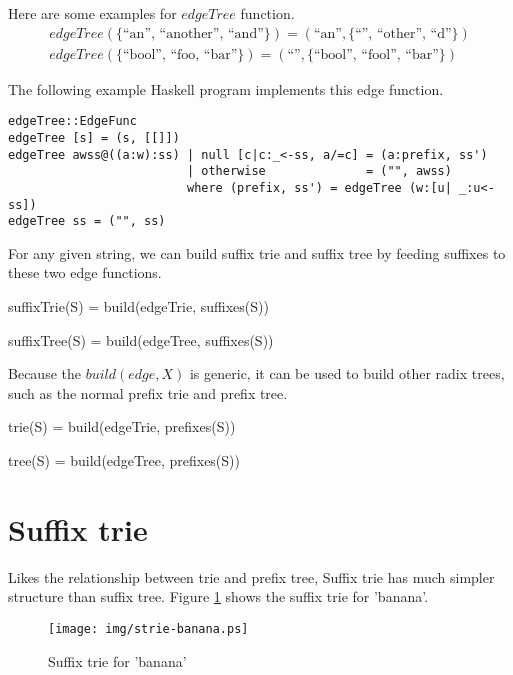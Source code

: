 \documentclass{article}
\begin{document}
Here are some examples for $edgeTree$ function.
\[
\begin{array}{l}
edgeTree(\{ \text{``an'', ``another'', ``and''}\}) = (\text{``an''}, \{\text{``'', ``other'', ``d''}\}) \\
edgeTree(\{ \text{``bool'', ``foo, ``bar''}\}) = (\text{``''}, \{\text{``bool'', ``fool'', ``bar''}\})
\end{array}
\]

The following example Haskell program implements this edge function.

\begin{lstlisting}
edgeTree::EdgeFunc
edgeTree [s] = (s, [[]])
edgeTree awss@((a:w):ss) | null [c|c:_<-ss, a/=c] = (a:prefix, ss')
                         | otherwise              = ("", awss)
                         where (prefix, ss') = edgeTree (w:[u| _:u<-ss])
edgeTree ss = ("", ss)
\end{lstlisting}

For any given string, we can build suffix trie and suffix tree by feeding suffixes to these
two edge functions.

\be
suffixTrie(S) = build(edgeTrie, suffixes(S))
\ee

\be
suffixTree(S) = build(edgeTree, suffixes(S))
\ee

Because the $build(edge, X)$ is generic, it can be used to build other radix trees, such
as the normal prefix trie and prefix tree.

\be
trie(S) = build(edgeTrie, prefixes(S))
\ee

\be
tree(S) = build(edgeTree, prefixes(S))
\ee

\section{Suffix trie}
\label{suffix-trie}

Likes the relationship between trie and prefix tree, Suffix trie has much simpler
structure than suffix tree. Figure \ref{fig:strie-banana} shows the suffix trie for
'banana'.

\begin{figure}[htbp]
  \centering
  \texttt{[image: img/strie-banana.ps]}
  \caption{Suffix trie for 'banana'} \label{fig:strie-banana}
\end{figure}
\end{document}
